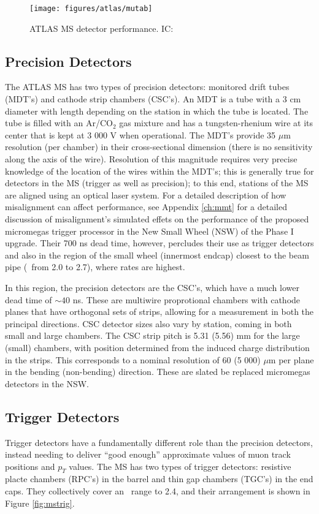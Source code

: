 \begin{figure}[!htbp]\captionsetup{justification=centering}
  \centering
  \texttt{[image: figures/atlas/mutab]}
  \caption{ATLAS MS detector performance.  IC: \cite{jinstpaper}}
  \label{fig:mutab}
\end{figure}

\subsection{Precision Detectors}
The ATLAS MS has two types of precision detectors: monitored drift tubes (MDT's) and cathode strip chambers (CSC's).  An MDT is a tube with a 3 cm diameter with length depending on the station in which the tube is located.  The tube is filled with an Ar/CO$_2$ gas mixture and has a tungsten-rhenium wire at its center that is kept at 3 000 V when operational.  The MDT's provide 35 $\mu$m resolution (per chamber) in their cross-sectional dimension (there is no sensitivity along the axis of the wire).  Resolution of this magnitude requires very precise knowledge of the location of the wires within the MDT's; this is generally true for detectors in the MS (trigger as well as precision); to this end, stations of the MS are aligned using an optical laser system.  For a detailed description of how misalignment can affect performance, see Appendix \ref{ch:mmt} for a detailed discussion of misalignment's simulated effets on the performance of the proposed micromegas trigger processor in the New Small Wheel (NSW) of the Phase I upgrade.  Their 700 ns dead time, however, percludes their use as trigger detectors and also in the region of the small wheel (innermost endcap) closest to the beam pipe (\aeta\, from 2.0 to 2.7), where rates are highest.

In this region, the precision detectors are the CSC's, which have a much lower dead time of $\sim40$ ns.  These are multiwire proprotional chambers with cathode planes that have orthogonal sets of strips, allowing for a measurement in both the principal directions.  CSC detector sizes also vary by station, coming in both small and large chambers.  The CSC strip pitch is 5.31 (5.56) mm for the large (small) chambers, with position determined from the induced charge distribution in the strips.  This corresponds to a nominal resolution of 60 (5 000) $\mu$m per plane in the bending (non-bending) direction.  These are slated be replaced micromegas detectors in the NSW.

\subsection{Trigger Detectors}
Trigger detectors have a fundamentally different role than the precision detectors, instead needing to deliver ``good enough'' approximate values of muon track positions and $p_T$ values.  The MS has two types of trigger detectors: resistive placte chambers (RPC's) in the barrel and thin gap chambers (TGC's) in the end caps.  They collectively cover an \aeta\, range to 2.4, and their arrangement is shown in Figure \ref{fig:mstrig}.

